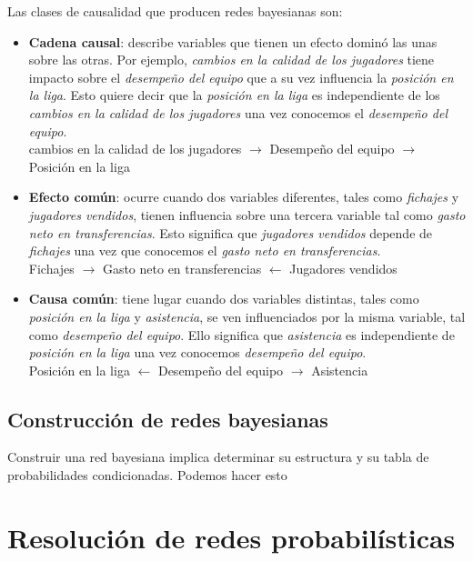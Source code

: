 Las clases de causalidad que producen redes bayesianas son:
\begin{itemize}
    \item \textbf{Cadena causal}: describe variables que tienen un efecto dominó las unas sobre las otras. Por ejemplo, \textit{cambios en la calidad de 
    los jugadores} tiene impacto sobre el \textit{desempeño del equipo} que a su vez influencia la \textit{posición en la liga}. 
    Esto quiere decir que la \textit{posición en la liga} es independiente de los \textit{cambios en la calidad de los jugadores} una vez conocemos el \textit{desempeño del equipo}.\\
    cambios en la calidad de los jugadores $\rightarrow$ Desempeño del equipo $\rightarrow$ Posición en la liga
    \item \textbf{Efecto común}: ocurre cuando dos variables diferentes, tales como \textit{fichajes} y \textit{jugadores vendidos}, tienen influencia sobre una tercera variable tal como 
    \textit{gasto neto en transferencias}. Esto significa que \textit{jugadores vendidos} depende de \textit{fichajes} una vez que conocemos el \textit{gasto neto en transferencias}.\\
    Fichajes $\rightarrow$ Gasto neto en transferencias $\leftarrow$ Jugadores vendidos    
    \item \textbf{Causa común}: tiene lugar cuando dos variables distintas, tales como \textit{posición en la liga} y \textit{asistencia}, se ven influenciados por la misma variable, tal 
    como \textit{desempeño del equipo}. Ello significa que \textit{asistencia} es independiente de \textit{posición en la liga} una vez conocemos \textit{desempeño del equipo}.\\
    Posición en la liga $\leftarrow$ Desempeño del equipo $\rightarrow$ Asistencia
\end{itemize}


\subsection{Construcción de redes bayesianas}
Construir una red bayesiana implica determinar su estructura y su tabla de probabilidades condicionadas. Podemos hacer esto 

\section{Resolución de redes probabilísticas}

